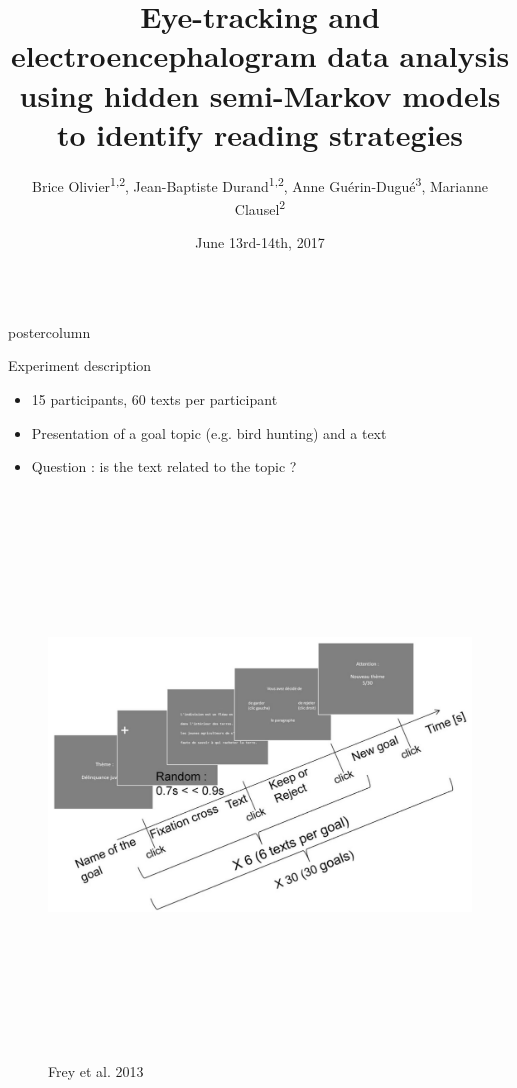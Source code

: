 \documentclass[final,hyperref={pdfpagelabels=false}]{beamer}
\title{Eye-tracking and electroencephalogram data analysis using hidden semi-Markov models to identify reading strategies}
\author{Brice Olivier\textsuperscript{1,2}, Jean-Baptiste Durand\textsuperscript{1,2}, Anne Guérin-Dugué\textsuperscript{3}, Marianne Clausel\textsuperscript{2}}
\institute{\textsuperscript{1}Inria, \textsuperscript{2}Laboratoire Jean Kuntzmann, \textsuperscript{3}Gipsa-lab}
\date[June 13rd-14th, 2017]{June 13rd-14th, 2017}
\newlength{\columnheight}
\begin{document}
\begin{frame}
  \begin{columns}
    \begin{column}{.49\textwidth}
      \begin{beamercolorbox}[center,wd=\textwidth]{postercolumn}
        \begin{minipage}[T]{.95\textwidth}  %
          \parbox[t][\columnheight]{\textwidth}{ %
            \begin{block}{Experiment description}
                \begin{itemize}
                    \item[\bullet] 15 participants, 60 texts per participant
                    \item[\bullet] Presentation of a goal topic (e.g. bird hunting) and a text
                    \item[\bullet] Question : is the text related to the topic ?
                \end{itemize}

                \begin{figure}[h]
                    \centering
                    \includegraphics[height=15cm]{experiment_description.jpg}
                    \caption{Frey et al. 2013}
                \end{figure}


\end{block}}
\end{minipage}
\end{beamercolorbox}
\end{column}
\end{columns}
\end{frame}
\end{document}
